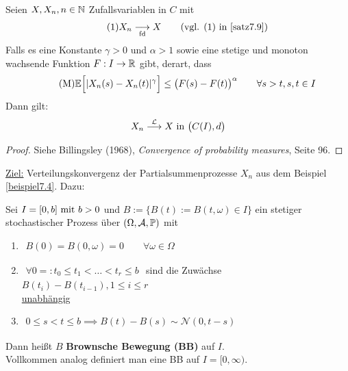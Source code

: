 \begin{satz}\label{satz7.11MomentenkriteriumVonKolmogoroff}\enter
	Seien $X,X_n,n\in\N$ Zufallsvariablen in $C$ mit
	\begin{align}\label{eqSatz7.11Vor1}\tag{1}
		X_n\stackrelnew{\text{fd}}{}{\longrightarrow} X\qquad\text{(vgl. (1) in \ref{satz7.9})}
	\end{align}
	Falls es eine Konstante $\gamma>0$ und $\alpha>1$ sowie eine stetige und monoton wachsende Funktion $F:I\to\R$ gibt, derart, dass
	\begin{align}\label{eqSatz7.11VorM}\tag{M}
		\E\Big[|X_n(s)-X_n(t)|^\gamma\Big]\leq\big(F(s)-F(t)\big)^\alpha\qquad\forall s>t,s,t\in I
	\end{align}
	Dann gilt:
	\begin{align*}
		X_n\stackrel{\L}{\longrightarrow} X\text{ in }\big(C(I),d\big)
	\end{align*}
\end{satz}

\begin{proof}
	Siehe Billingsley (1968), \textit{Convergence of probability measures}, Seite 96.
\end{proof}

\ul{Ziel:} Verteilungskonvergenz der Partialsummenprozesse $X_n$ aus dem Beispiel \ref{beispiel7.4}. 
Dazu:

\begin{definition}\label{def7.12} %
	Sei $I=[0,b]\mit b>0$ und $B:=\big\lbrace B(t):=B(t,\omega)\in I\big\rbrace$ ein stetiger stochastischer Prozess über $(\Omega,\A,\P)$ mit 
	\begin{enumerate}[label=(\arabic*)]
		\item $\begin{aligned}
			B(0)=B(0,\omega)=0\qquad\forall\omega\in\Omega
		\end{aligned}$
		\item $\begin{aligned}
			\forall 0=:t_0\leq t_1<\ldots<t_r\leq b
		\end{aligned}$ sind die Zuwächse $B(t_i)-B(t_{i-1}),1\leq i\leq r$\\ \ul{unabhängig}
		\item $\begin{aligned}
			0\leq s<t\leq b\implies B(t)-B(s)\sim\mathcal{N}(0,t-s)
		\end{aligned}$
	\end{enumerate}
	Dann heißt $B$ \textbf{Brownsche Bewegung (BB)} auf $I$.\\
	Vollkommen analog definiert man eine BB auf $I=[0,\infty)$.
\end{definition}

